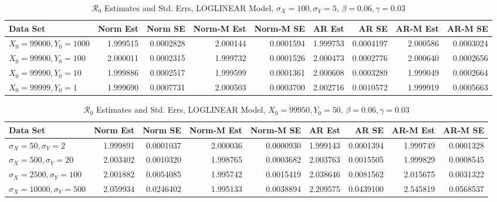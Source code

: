 \message{ !name(draft_v13.tex)}\documentclass[12pt]{article}
\newcommand{\rr}{\ensuremath{\mathcal{R}_0}}
\begin{document}
\begin{table}[H]
	
	\caption{\label{tab:}$\rr$ Estimates and Std. Errs, LOGLINEAR Model,
		$\sigma_X = 100, \sigma_Y = 5$, $\beta = 0.06, \gamma = 0.03$}
	\centering
	\begin{footnotesize}
		\begin{tabular}[t]{l|r|r|r|r|r|r|r|r}
			\hline
			Data Set & Norm Est & Norm SE & Norm-M Est & Norm-M SE & AR Est & AR SE & AR-M Est & AR-M SE\\
			\hline
			$X_0 = 99000, Y_0 = 1000$ & 1.999515 & 0.0002828 & 2.000144 & 0.0001594 & 1.999753 & 0.0004197 & 2.000586 & 0.0003024\\
			\hline
			$X_0 = 99900, Y_0 = 100$ & 2.000011 & 0.0002315 & 1.999732 & 0.0001526 & 2.000473 & 0.0002776 & 2.000640 & 0.0002656\\
			\hline
			$X_0 = 99990, Y_0 = 10$ & 1.999886 & 0.0002517 & 1.999599 & 0.0001361 & 2.000608 & 0.0003289 & 1.999049 & 0.0002664\\
			\hline
			$X_0 = 99999, Y_0 = 1$ & 1.999690 & 0.0007731 & 2.000503 & 0.0003700 & 2.002716 & 0.0010572 & 1.999919 & 0.0005663\\
			\hline
		\end{tabular}
	\end{footnotesize}
\end{table}

\begin{table}[H]
	
	\caption{\label{tab:}$\rr$ Estimates and Std. Errs, LOGLINEAR Model,
		$X_0 = 99950, Y_0 = 50$, $\beta = 0.06, \gamma = 0.03$}
	\centering
	\begin{footnotesize}
		\begin{tabular}[t]{l|r|r|r|r|r|r|r|r}
			\hline
			Data Set & Norm Est & Norm SE & Norm-M Est & Norm-M SE & AR Est & AR SE & AR-M Est & AR-M SE\\
			\hline
			$\sigma_X = 50, \sigma_Y = 2$ & 1.999891 & 0.0001037 & 2.000036 & 0.0000930 & 1.999143 & 0.0001394 & 1.999749 & 0.0001328\\
			\hline
			$\sigma_X = 500, \sigma_Y = 20$ & 2.003402 & 0.0010320 & 1.998765 & 0.0003682 & 2.003763 & 0.0015505 & 1.999829 & 0.0008545\\
			\hline
			$\sigma_X = 2500, \sigma_Y = 100$ & 2.001882 & 0.0054085 & 1.995742 & 0.0015419 & 2.038646 & 0.0081562 & 2.015675 & 0.0031322\\
			\hline
			$\sigma_X = 10000, \sigma_Y = 500$ & 2.059934 & 0.0246402 & 1.995133 & 0.0038894 & 2.209575 & 0.0439100 & 2.545819 & 0.0568537\\
			\hline
		\end{tabular}
	\end{footnotesize}
\end{table}
\end{document}
